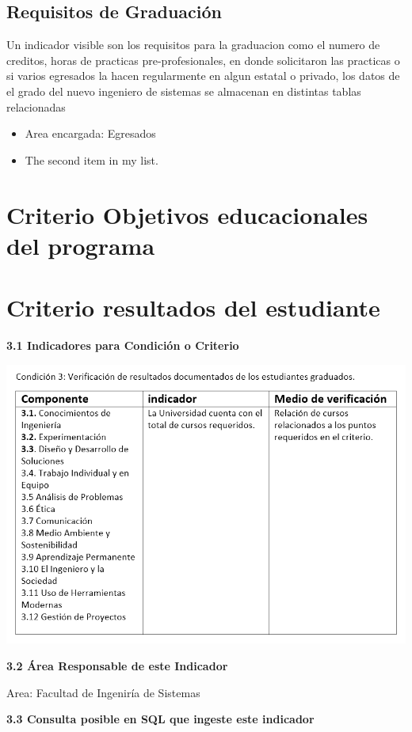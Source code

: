 \documentclass[12pt,a4paper]{report}
\begin{document}
\subsection{Requisitos de Graduación}
Un indicador visible son los requisitos para la graduacion como el numero de creditos, horas de practicas pre-profesionales, en donde solicitaron las practicas o si varios egresados la hacen regularmente en algun estatal o privado, los datos de el grado del nuevo ingeniero de sistemas se almacenan en distintas tablas relacionadas
\begin{itemize}
\item Area encargada: Egresados
\item The second item in my list.
\end{itemize}

\section{ Criterio Objetivos educacionales del programa}

\section{ Criterio resultados del estudiante}
\textbf{3.1 Indicadores para Condición o Criterio}
\begin{center}
\includegraphics[width=15cm]{./Images/resultado}
\end{center}	

\textbf{3.2 Área Responsable de este Indicador}

 Area: Facultad de Ingeniría de Sistemas

\textbf{3.3 Consulta posible en SQL que ingeste este indicador}\\
\end{document}
